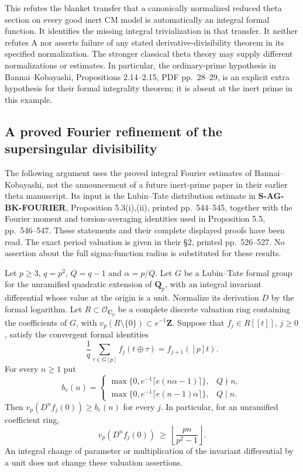 This refutes the blanket transfer that a canonically normalized
reduced theta section on every good inert CM model is automatically
an integral formal function. It identifies the missing integral
trivialization in that transfer. It neither refutes A nor asserts
failure of any stated derivative-divisibility theorem in its
specified normalization. The stronger classical theta theory
may supply different normalizations or estimates. In particular,
the ordinary-prime hypothesis in Bannai--Kobayashi,
Propositions 2.14--2.15, PDF pp.~28--29, is an explicit extra
hypothesis for their formal integrality theorem; it is absent
at the inert prime in this example.

\subsection{A proved Fourier refinement of the supersingular divisibility}

The following argument uses the proved integral Fourier estimates of
Bannai--Kobayashi, not the announcement of a future inert-prime paper in
their earlier theta manuscript.  Its input is the Lubin--Tate distribution
estimate in \textbf{S-AG-BK-FOURIER}, Proposition 5.3(i),(ii), printed
pp.~544--545, together with the Fourier moment and torsion-averaging
identities used in Proposition 5.5, pp.~546--547.  These statements and
their complete displayed proofs have been read.  The exact period
valuation is given in their \S2, printed pp.~526--527.  No assertion
about the full sigma-function radius is substituted for these results.

\begin{proposition}
Let $p\geq3$, $q=p^2$, $Q=q-1$ and $\alpha=p/Q$.  Let $G$ be a
Lubin--Tate formal group for the unramified quadratic extension of
$\mathbf Q_p$, with an integral invariant differential whose value at the
origin is a unit.  Normalize its derivation $D$ by the formal logarithm.
Let $R\subset\mathcal O_{\mathbf C_p}$ be a complete discrete valuation
ring containing the coefficients of $G$, with $v_p(R\setminus\{0\})
\subset e^{-1}\mathbf Z$.  Suppose that $f_j\in R[[t]]$, $j\geq0$,
satisfy the convergent formal identities
\[
 \frac1q\sum_{\tau\in G[p]} f_j(t\mathbin\oplus\tau)
       =f_{j+1}([p]t).                                      \tag{AG-Fourier-trace}
\]
For every $n\geq1$ put
\[
 b_e(n)=
 \begin{cases}
 \max\{0,e^{-1}\lceil e(n\alpha-1)\rceil\},&Q\nmid n,\\
 \max\{0,e^{-1}\lceil e(n-1)\alpha\rceil\},&Q\mid n.
 \end{cases}
\]
Then $v_p(D^nf_j(0))\geq b_e(n)$ for every $j$.  In particular, for
an unramified coefficient ring,
\[
             v_p(D^nf_j(0))\ \geq\ \left\lfloor\frac{pn}{p^2-1}\right\rfloor.
                                                               \tag{AG-Fourier-floor}
\]
An integral change of parameter or multiplication of the invariant
differential by a unit does not change these valuation assertions.
\end{proposition}

